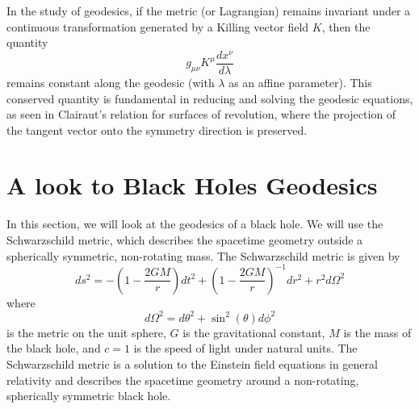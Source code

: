 \documentclass[12pt]{article}
\begin{document}
In the study of geodesics, if the metric (or Lagrangian) remains invariant under a continuous transformation generated by a Killing vector field \( K \), then the quantity
\[
    g_{\mu\nu}K^{\mu}\frac{dx^{\nu}}{d\lambda}
\]
remains constant along the geodesic (with \( \lambda \) as an affine parameter). 
This conserved quantity is fundamental in reducing and solving the geodesic equations, as seen in Clairaut's relation for surfaces of revolution, where the projection of the tangent vector onto the symmetry direction is preserved.

\section{A look to Black Holes Geodesics}

In this section, we will look at the geodesics of a black hole.
We will use the Schwarzschild metric, which describes the spacetime geometry outside a spherically symmetric, non-rotating mass. The Schwarzschild metric is given by
\begin{equation}\label{eq:schwarzschild_metric}
	ds^2 = -\left(1 - \frac{2GM}{r}\right) dt^2 + \left(1 - \frac{2GM}{r}\right)^{-1} dr^2 + r^2 d\Omega^2
\end{equation}
where 
\[
d\Omega^2 = d\theta^2 + \sin^2(\theta) d\phi^2
\] 
is the metric on the unit sphere, \(G\) is the gravitational constant, \(M\) is the mass of the black hole, and \(c = 1\) is the speed of light under natural units.
The Schwarzschild metric is a solution to the Einstein field equations in general relativity and describes the spacetime geometry around a non-rotating, spherically symmetric black hole.
\end{document}
